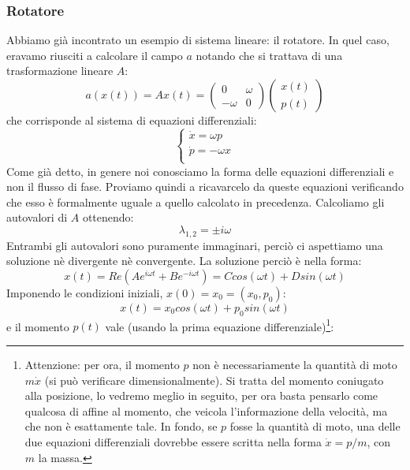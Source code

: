 \documentclass[a4paper,openany]{article}
\begin{document}
	\subsubsection{Rotatore}
	Abbiamo già incontrato un esempio di sistema lineare: il rotatore. In quel caso, eravamo riusciti a calcolare il campo $a$ notando che si trattava di una trasformazione lineare $A$:
	\begin{equation}
		a(x(t)) = Ax(t) =
		\begin{pmatrix}
			0 & \omega \\
			-\omega & 0
		\end{pmatrix}
		\begin{pmatrix}
			x(t) \\ p(t)
		\end{pmatrix}
	\end{equation}
	che corrisponde al sistema di equazioni differenziali:
	\begin{equation}
		\begin{cases}
			\dot{x} = \omega p \\
			\dot{p} = -\omega x \\
		\end{cases}
		\label{DiffRotat}
	\end{equation}
	Come già detto, in genere noi conosciamo la forma delle equazioni differenziali e non il flusso di fase. Proviamo quindi a ricavarcelo da queste equazioni verificando che esso è formalmente uguale a quello calcolato in precedenza. Calcoliamo gli autovalori di $A$ ottenendo:
	$$
	\lambda_{1,2} = \pm i \omega
	$$
	Entrambi gli autovalori sono puramente immaginari, perciò ci aspettiamo una soluzione nè divergente nè convergente. La soluzione perciò è nella forma:
	\begin{equation}
		x(t) = Re(Ae^{i\omega t} + Be^{-i\omega t}) = C cos(\omega t) + D sin(\omega t)
	\end{equation}
	Imponendo le condizioni iniziali, $x(0) = x_{0} = (x_{0},p_{0})$:
	\begin{equation}
		x(t) =  x_{0}cos(\omega t) + p_{0}sin(\omega t)
	\end{equation}
	e il momento $p(t)$ vale (usando la prima equazione differenziale)\footnote{Attenzione: per ora, il momento $p$ non è necessariamente la quantità di moto $m\dot{x}$ (si può verificare dimensionalmente). Si tratta del momento coniugato alla posizione, lo vedremo meglio in seguito, per ora basta pensarlo come qualcosa di affine al momento, che veicola l'informazione della velocità, ma che non è esattamente tale. In fondo, se $p$ fosse la quantità di moto, una delle due equazioni differenziali dovrebbe essere scritta nella forma $\dot{x} = p/m$, con $m$ la massa.}:
\end{document}
